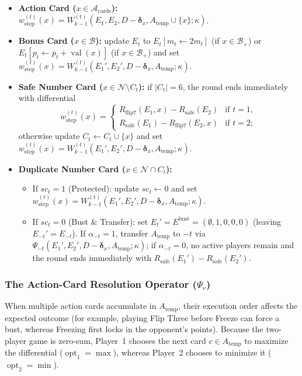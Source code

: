 \documentclass{article}
\theoremstyle{plain}
\theoremstyle{definition}
\theoremstyle{remark}
\DeclareMathOperator{\val}{val}
\begin{document}
\begin{itemize}
    \item \textbf{Action Card ($x \in \mathcal{A}_{\text{cards}}$):} $w_{\text{step}}^{(t)}(x) = W_{k-1}^{(t)}(E_1, E_2, D - \boldsymbol{\delta}_x, A_{\text{temp}} \cup \{x\}; \kappa)$.
    \item \textbf{Bonus Card ($x \in \mathcal{B}$):} update $E_t$ to $E_t[m_t \leftarrow 2m_t]$ (if $x \in \mathcal{B}_{\times}$) or $E_t[p_t \leftarrow p_t + \val(x)]$ (if $x \in \mathcal{B}_{+}$) and set $w_{\text{step}}^{(t)}(x) = W_{k-1}^{(t)}(E_1', E_2', D - \boldsymbol{\delta}_x, A_{\text{temp}}; \kappa)$.
    \item \textbf{Safe Number Card ($x \in \mathcal{N} \setminus C_t$):} if $|C_t| = 6$, the round ends immediately with differential
    \[
        w_{\text{step}}^{(t)}(x) =
        \begin{cases}
            R_{\text{flip7}}(E_1, x) - R_{\text{safe}}(E_2) & \text{if } t = 1, \\
            R_{\text{safe}}(E_1) - R_{\text{flip7}}(E_2, x) & \text{if } t = 2;
        \end{cases}
    \]
    otherwise update $C_t \leftarrow C_t \cup \{x\}$ and set $w_{\text{step}}^{(t)}(x) = W_{k-1}^{(t)}(E_1', E_2', D - \boldsymbol{\delta}_x, A_{\text{temp}}; \kappa)$.
    \item \textbf{Duplicate Number Card ($x \in \mathcal{N} \cap C_t$):}
    \begin{itemize}
        \item If $sc_t = 1$ (Protected): update $sc_t \leftarrow 0$ and set $w_{\text{step}}^{(t)}(x) = W_{k-1}^{(t)}(E_1', E_2', D - \boldsymbol{\delta}_x, A_{\text{temp}}; \kappa)$.
        \item If $sc_t = 0$ (Bust \& Transfer): set $E_t' = E^{\text{bust}} = (\emptyset, 1, 0, 0, 0)$ (leaving $E_{-t}' = E_{-t}$). If $\alpha_{-t} = 1$, transfer $A_{\text{temp}}$ to $-t$ via $\Psi_{-t}(E_1', E_2', D - \boldsymbol{\delta}_x, A_{\text{temp}}; \kappa)$; if $\alpha_{-t} = 0$, no active players remain and the round ends immediately with $R_{\text{safe}}(E_1') - R_{\text{safe}}(E_2')$.
    \end{itemize}
\end{itemize}

\subsubsection{The Action-Card Resolution Operator ($\Psi_r$)}
When multiple action cards accumulate in $A_{\text{temp}}$, their execution order affects the expected outcome (for example, playing Flip Three before Freeze can force a bust, whereas Freezing first locks in the opponent's points). Because the two-player game is zero-sum, Player~1 chooses the next card $c \in A_{\text{temp}}$ to maximize the differential ($\operatorname{opt}_1 = \max$), whereas Player~2 chooses to minimize it ($\operatorname{opt}_2 = \min$).
\end{document}
